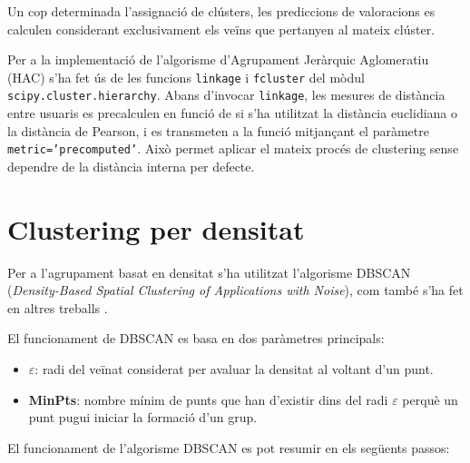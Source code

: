 \documentclass[a4paper,12pt]{report}
\begin{document}
Un cop determinada l’assignació de clústers, les prediccions de valoracions es calculen considerant exclusivament els veïns que pertanyen al mateix clúster.

Per a la implementació de l’algorisme d’Agrupament Jeràrquic Aglomeratiu (HAC) s'ha fet ús de les funcions \texttt{linkage} i \texttt{fcluster} del mòdul \texttt{scipy.cluster.hierarchy}. Abans d’invocar \texttt{linkage}, les mesures de distància entre usuaris es precalculen en funció de si s’ha utilitzat la distància euclidiana o la distància de Pearson, i es transmeten a la funció mitjançant el paràmetre \texttt{metric='precomputed'}. Això permet aplicar el mateix procés de clustering sense dependre de la distància interna per defecte.

\section{Clustering per densitat}

Per a l’agrupament basat en densitat s’ha utilitzat l’algorisme DBSCAN (\emph{Density-Based Spatial Clustering of Applications with Noise}), com també s’ha fet en altres treballs \cite{satsiou2017hybrid}.

El funcionament de DBSCAN es basa en dos paràmetres principals:
\begin{itemize}
    \item \textbf{\( \varepsilon \)}: radi del veïnat considerat per avaluar la densitat al voltant d’un punt.
    \item \textbf{MinPts}: nombre mínim de punts que han d’existir dins del radi \( \varepsilon \) perquè un punt pugui iniciar la formació d’un grup.
\end{itemize}

El funcionament de l’algorisme DBSCAN es pot resumir en els següents passos:
\end{document}
